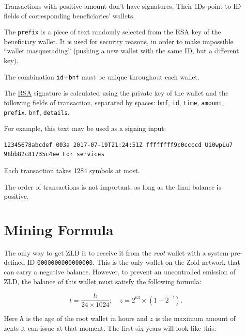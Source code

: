 \documentclass[11pt,oneside]{article}
\newcommand\dd[1]{\colorbox{gray!30}{\texttt{#1}}}
\begin{document}
Transactions with positive amount don't have signatures.
Their IDs point to ID fields of corresponding beneficiaries' wallets.

The \dd{prefix} is a piece of text randomly selected from the RSA key
of the beneficiary wallet. It is used for security reasons, in order
to make impossible ``wallet masquerading'' (pushing a new wallet with the
same ID, but a different key).

The combination \dd{id}+\dd{bnf} must be unique throughout each wallet.

The \href{https://en.wikipedia.org/wiki/RSA_(cryptosystem)}{RSA}
signature is calculated using the private key of the
wallet and the following fields of transaction, separated by spaces:
\dd{bnf}, \dd{id}, \dd{time}, \dd{amount}, \dd{prefix}, \dd{bnf}, \dd{details}.

For example, this text may be used as a signing input:

\begin{verbatim}
12345678abcdef 003a 2017-07-19T21:24:51Z ffffffff9c0ccccd Ui0wpLu7 98bb82c81735c4ee For services
\end{verbatim}

Each transaction takes 1284 symbols at most.

The order of transactions is not important, as long as the final balance is positive.

\section{Mining Formula}\label{sec:formula}

The only way to get ZLD is to receive it from the \emph{root} wallet
with a system pre-defined ID \dd{0000000000000000}.
This is the only wallet on the Zold network that can carry a negative balance.
However, to prevent an uncontrolled emission of ZLD, the balance
of this wallet must satisfy the following formula:

\begin{equation}
t = \frac{h}{24 \times 1024}; \quad z = 2^{63} \times (1 - 2^{-t}).
\end{equation}

Here $h$ is the age of the root wallet in hours and $z$ is the maximum
amount of zents it can issue at that moment. The first
six years will look like this:
\end{document}
